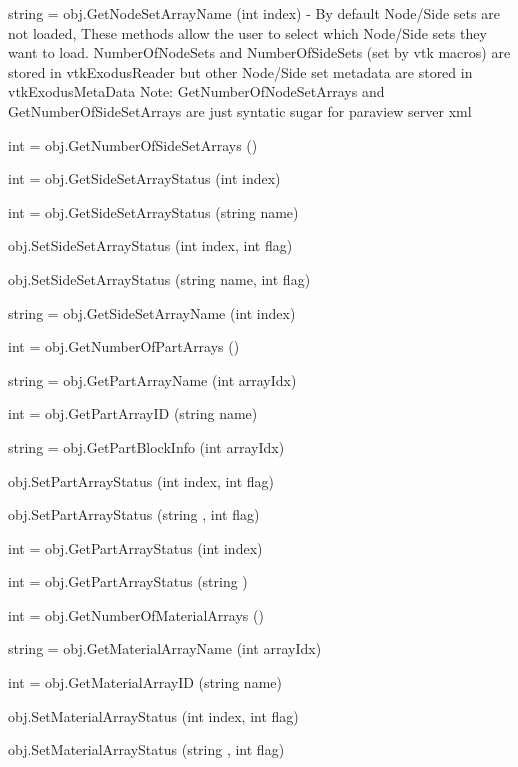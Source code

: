 \begin{DoxyItemize}
\item {\ttfamily string = obj.\-Get\-Node\-Set\-Array\-Name (int index)} -\/ By default Node/\-Side sets are not loaded, These methods allow the user to select which Node/\-Side sets they want to load. Number\-Of\-Node\-Sets and Number\-Of\-Side\-Sets (set by vtk macros) are stored in vtk\-Exodus\-Reader but other Node/\-Side set metadata are stored in vtk\-Exodus\-Meta\-Data Note\-: Get\-Number\-Of\-Node\-Set\-Arrays and Get\-Number\-Of\-Side\-Set\-Arrays are just syntatic sugar for paraview server xml  
\item {\ttfamily int = obj.\-Get\-Number\-Of\-Side\-Set\-Arrays ()}  
\item {\ttfamily int = obj.\-Get\-Side\-Set\-Array\-Status (int index)}  
\item {\ttfamily int = obj.\-Get\-Side\-Set\-Array\-Status (string name)}  
\item {\ttfamily obj.\-Set\-Side\-Set\-Array\-Status (int index, int flag)}  
\item {\ttfamily obj.\-Set\-Side\-Set\-Array\-Status (string name, int flag)}  
\item {\ttfamily string = obj.\-Get\-Side\-Set\-Array\-Name (int index)}  
\item {\ttfamily int = obj.\-Get\-Number\-Of\-Part\-Arrays ()}  
\item {\ttfamily string = obj.\-Get\-Part\-Array\-Name (int array\-Idx)}  
\item {\ttfamily int = obj.\-Get\-Part\-Array\-I\-D (string name)}  
\item {\ttfamily string = obj.\-Get\-Part\-Block\-Info (int array\-Idx)}  
\item {\ttfamily obj.\-Set\-Part\-Array\-Status (int index, int flag)}  
\item {\ttfamily obj.\-Set\-Part\-Array\-Status (string , int flag)}  
\item {\ttfamily int = obj.\-Get\-Part\-Array\-Status (int index)}  
\item {\ttfamily int = obj.\-Get\-Part\-Array\-Status (string )}  
\item {\ttfamily int = obj.\-Get\-Number\-Of\-Material\-Arrays ()}  
\item {\ttfamily string = obj.\-Get\-Material\-Array\-Name (int array\-Idx)}  
\item {\ttfamily int = obj.\-Get\-Material\-Array\-I\-D (string name)}  
\item {\ttfamily obj.\-Set\-Material\-Array\-Status (int index, int flag)}  
\item {\ttfamily obj.\-Set\-Material\-Array\-Status (string , int flag)}  

\end{DoxyItemize}
